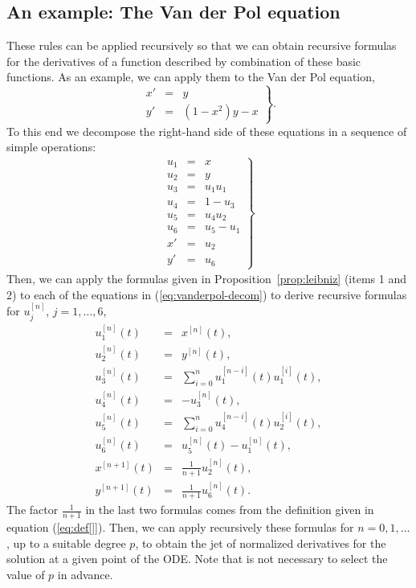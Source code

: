 \documentclass[12pt,twoside]{article}
\begin{document}
\subsection{An example: The Van der Pol equation}
These rules can be applied recursively so that we can obtain recursive
formulas for the derivatives of a function described by combination of
these basic functions. As an example, we can apply them to the Van der
Pol equation,
\[
\left.
\begin{array}{rcl}
x'&=&y\\
y'&=&(1-x^2)y-x
\end{array}
\right\}.
\]
To this end we decompose the right-hand side of these equations in a
sequence of simple operations:
\begin{eqnarray}
\left.
\begin{array}{rcl}
u_1 & = & x\\
u_2 & = & y\\
u_3 & = & u_1 u_1\\
u_4 & = & 1-u_3\\
u_5 & = & u_4 u_2\\
u_6 & = & u_5-u_1\\
x'  & = & u_2\\
y'  & = & u_6
\end{array}
\right\}
\label{eq:vanderpol-decom}
\end{eqnarray}
Then, we can apply the formulas given in
Proposition~\ref{prop:leibniz} (items 1 and 2) to each of the
equations in (\ref{eq:vanderpol-decom}) to derive recursive formulas
for $u_j^{[n]}$, $j=1,\ldots,6$,
\begin{eqnarray*}
u_1^{[n]}(t) & = & x^{[n]}(t),\\
u_2^{[n]}(t) & = & y^{[n]}(t),\\
u_3^{[n]}(t) & = & \sum_{i=0}^n u_1^{[n-i]}(t)u_1^{[i]}(t),\\
u_4^{[n]}(t) & = & -u_3^{[n]}(t),\\
u_5^{[n]}(t) & = & \sum_{i=0}^n u_4^{[n-i]}(t)u_2^{[i]}(t),\\
u_6^{[n]}(t) & = & u_5^{[n]}(t)-u_1^{[n]}(t),\\
x^{[n+1]}(t) & = & \frac{1}{n+1} u_2^{[n]}(t),\\
y^{[n+1]}(t) & = & \frac{1}{n+1} u_6^{[n]}(t).
\end{eqnarray*}
The factor $\frac{1}{n+1}$ in the last two formulas comes from the
definition given in equation (\ref{eq:def[]}). Then, we can apply
recursively these formulas for $n=0,1,\ldots$, up to a suitable degree
$p$, to obtain the jet of normalized derivatives for the solution at a
given point of the ODE. Note that is not necessary to select the value
of $p$ in advance.
\end{document}
